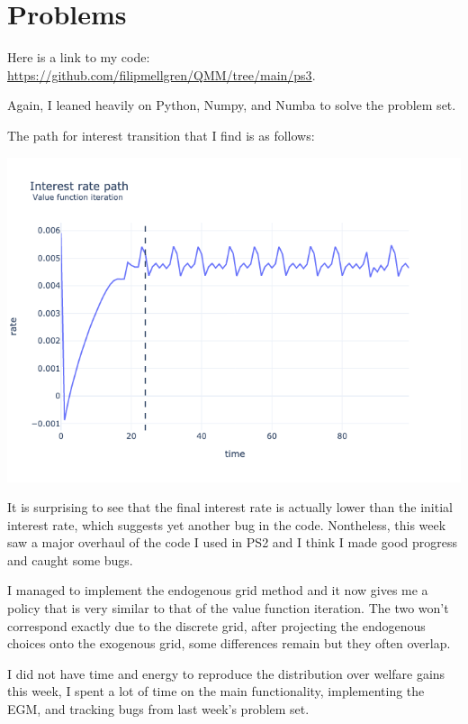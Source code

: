 \section{Problems}

\begin{questions}
\begin{solution}

Here is a link to my code: \url{https://github.com/filipmellgren/QMM/tree/main/ps3}.

Again, I leaned heavily on Python, Numpy, and Numba to solve the problem set.

The path for interest transition that I find is as follows:

\includegraphics[scale=0.5]{figures/rate_path.png}

It is surprising to see that the final interest rate is actually lower than the initial interest rate, which suggests yet another bug in the code. Nontheless, this week saw a major overhaul of the code I used in PS2 and I think I made good progress and caught some bugs. 

I managed to implement the endogenous grid method and it now gives me a policy that is very similar to that of the value function iteration. The two won't correspond exactly due to the discrete grid, after projecting the endogenous choices onto the exogenous grid, some differences remain but they often overlap.

I did not have time and energy to reproduce the distribution over welfare gains this week, I spent a lot of time on the main functionality, implementing the EGM, and tracking bugs from last week's problem set.

\end{solution}
\end{questions}



